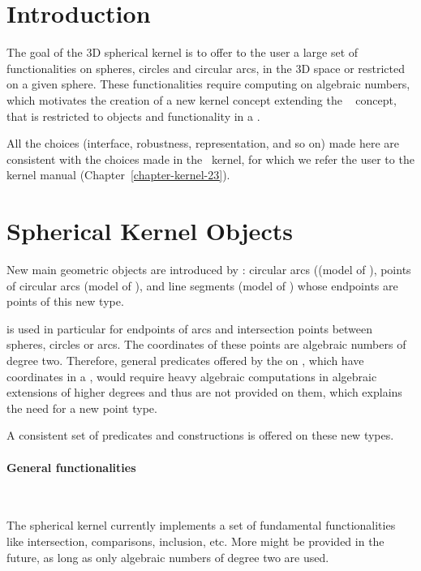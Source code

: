 \section{Introduction}

The goal of the 3D spherical kernel is to offer to the user a large
set of functionalities on spheres, circles and circular arcs, in the 3D
space or restricted on a given sphere. These functionalities require 
computing on algebraic numbers,
which motivates the creation of a new kernel concept extending the
\cgal\  concept, that is restricted to objects
and functionality in a .

All the choices (interface, robustness, representation, and so on)
made here are consistent with the choices made in the \cgal\ kernel,
for which we refer the user to the kernel manual
(Chapter~\ref{chapter-kernel-23}).

\section{Spherical Kernel Objects\label{section-SK-objects}}

New main geometric objects are introduced by :
circular arcs ((model of ), points
of circular arcs (model of ),
and line segments (model of ) whose
endpoints are points of this new type.

 is used in particular for
endpoints of arcs and intersection points between spheres, circles or
arcs. The coordinates of these points are algebraic numbers of degree
two. Therefore, general predicates offered by the  on
, which have coordinates in a ,
would require heavy algebraic computations in algebraic extensions
of higher degrees and thus are not provided on
them, which explains the need for a new point type. 

A consistent set of predicates and constructions is offered on these
new types. 

\paragraph{General functionalities}~

The spherical kernel currently implements a set of
fundamental functionalities like intersection, comparisons, inclusion,
etc. More might be provided in the future, as long as only algebraic
numbers of degree two are used.

